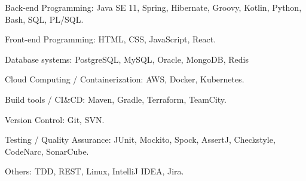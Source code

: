 

\begin{cvskills}


  \cvskill
    {Back-end Programming:} %
    {Java SE 11, Spring, Hibernate, Groovy, Kotlin, Python, Bash, SQL, PL/SQL.} %

  \cvskill
    {Front-end Programming:} %
    {HTML, CSS, JavaScript, React.} %

  \cvskill
    {Database systems:} %
    {PostgreSQL, MySQL, Oracle, MongoDB, Redis} %

  \cvskill
    {Cloud Computing / Containerization:} %
    {AWS, Docker, Kubernetes.} %

  \cvskill
    {Build tools / CI\&CD:} %
    {Maven, Gradle, Terraform, TeamCity.} %

  \cvskill
    {Version Control:} %
    {Git, SVN.} %

  \cvskill
    {Testing / Quality Assurance:} %
    {JUnit, Mockito, Spock, AssertJ, Checkstyle, CodeNarc, SonarCube.} %
    
  \cvskill
    {Others:} %
    {TDD, REST, Linux, IntelliJ IDEA, Jira.} %



\end{cvskills}
